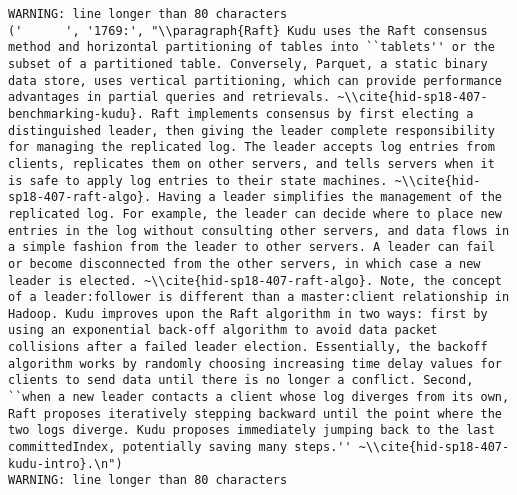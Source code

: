 \begin{tiny}
\begin{verbatim}
WARNING: line longer than 80 characters
('      ', '1769:', "\\paragraph{Raft} Kudu uses the Raft consensus method and horizontal partitioning of tables into ``tablets'' or the subset of a partitioned table. Conversely, Parquet, a static binary data store, uses vertical partitioning, which can provide performance advantages in partial queries and retrievals. ~\\cite{hid-sp18-407-benchmarking-kudu}. Raft implements consensus by first electing a distinguished leader, then giving the leader complete responsibility for managing the replicated log. The leader accepts log entries from clients, replicates them on other servers, and tells servers when it is safe to apply log entries to their state machines. ~\\cite{hid-sp18-407-raft-algo}. Having a leader simplifies the management of the replicated log. For example, the leader can decide where to place new entries in the log without consulting other servers, and data flows in a simple fashion from the leader to other servers. A leader can fail or become disconnected from the other servers, in which case a new leader is elected. ~\\cite{hid-sp18-407-raft-algo}. Note, the concept of a leader:follower is different than a master:client relationship in Hadoop. Kudu improves upon the Raft algorithm in two ways: first by using an exponential back-off algorithm to avoid data packet collisions after a failed leader election. Essentially, the backoff algorithm works by randomly choosing increasing time delay values for clients to send data until there is no longer a conflict. Second, ``when a new leader contacts a client whose log diverges from its own, Raft proposes iteratively stepping backward until the point where the two logs diverge. Kudu proposes immediately jumping back to the last committedIndex, potentially saving many steps.'' ~\\cite{hid-sp18-407-kudu-intro}.\n")
WARNING: line longer than 80 characters

\end{verbatim}
\end{tiny}
